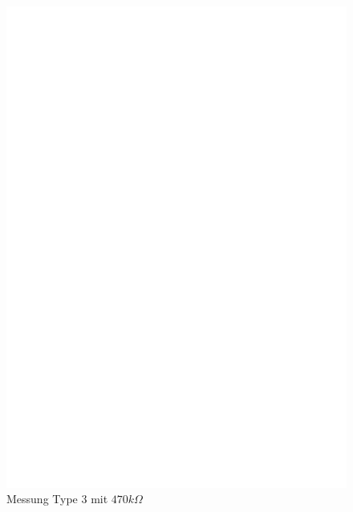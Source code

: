 \begin{figure}[H]
\centering
\includegraphics[]{../FIG/ResistormessH1.eps}
\caption{Messung Type 3 mit \(470k\Omega\) }
\label{fig:RH1mes}
\end{figure}

